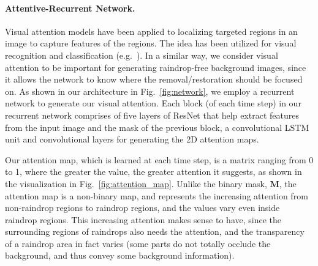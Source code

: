 \documentclass[10pt,twocolumn,letterpaper]{article}
\begin{document}
\paragraph{Attentive-Recurrent Network.}
Visual attention models have been applied to localizing targeted regions in an image to capture features of the regions.  The idea has been utilized for visual recognition and classification (e.g.~\cite{zhao2016diversified,mnih2014recurrent,gregor2015draw}). In a similar way, we consider visual attention to be important for generating raindrop-free background images, since it allows the network to know where the removal/restoration should be focused on. As shown in our architecture in Fig.~\ref{fig:network}, we employ a recurrent network to generate our visual attention.
Each block (of each time step) in our recurrent network comprises of five layers of ResNet \cite{he2016deep} that help extract features from the input image and the mask of the previous block, a convolutional LSTM unit \cite{xingjian2015convolutional}  and convolutional layers for generating the 2D attention maps.

Our attention map, which is learned at each time step, is a matrix ranging from 0 to 1, where the greater the value, the greater attention it suggests, as shown in the visualization in Fig.~\ref{fig:attention_map}. Unlike the binary mask, $\mathbf{M}$, the attention map is a  non-binary map, and represents the increasing attention from non-raindrop regions to raindrop regions, and the values vary even inside raindrop regions. This increasing attention makes sense to have, since the surrounding regions of raindrops also needs the attention, and the transparency of a raindrop area in fact varies (some parts do not totally occlude the background, and thus convey some background information).
\end{document}

